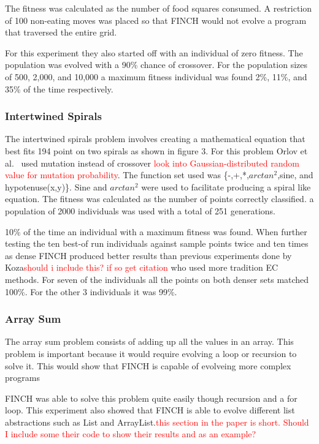 \documentclass{sig-alternate}
\newcommand{\mycomment}[1]{\textcolor{red}{#1}}
\begin{document}
The fitness was calculated as the number of food squares consumed. A restriction of 100 non-eating moves was placed so that FINCH would not evolve a program that traversed the entire grid. 

For this experiment they also started off with an individual of zero fitness. The population was evolved with a 90\% chance of crossover. For the population sizes of 500, 2,000, and 10,000 a maximum fitness individual was found 2\%, 11\%, and 35\% of the time respectively.
 
\subsubsection{Intertwined Spirals}
The intertwined spirals problem involves creating a mathematical equation that best fits 194 point on two spirals as shown in figure 3. For this problem Orlov et al.~\cite{FINCH:2011} used mutation instead of crossover \mycomment{look into Gaussian-distributed random value for mutation probability}. The function set used was \{-,+,*,$arctan^2$,sine, and hypotenuse(x,y)\}. Sine and $arctan^2$ were used to facilitate producing a spiral like equation. The fitness was calculated as the number of points correctly classified. a population of 2000 individuals was used with a total of 251 generations. 

	10\% of the time an individual with a maximum fitness was found. When further testing the ten best-of run individuals against sample points twice and ten times as dense FINCH produced better results than previous experiments done by Koza\mycomment{should i include this? if so get citation} who used more tradition EC methods. For seven of the individuals all the points on both denser sets matched 100\%. For the other 3 individuals it was 99\%. 
\subsubsection{Array Sum}
The array sum problem consists of adding up all the values in an array. This problem is important because it would require evolving a loop or recursion to solve it. This would show that FINCH is capable of evolveing more complex programs\par
FINCH was able to solve this problem quite easily though recursion and a for loop. This experiment also showed that FINCH is able to evolve different list abstractions such as List and ArrayList.\mycomment{this section in the paper is short. Should I include some their code to show their results and as an example?} 
\end{document}
